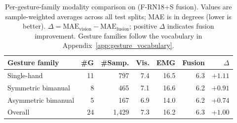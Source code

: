 \begin{table}[h]
\centering
\caption{Per-gesture-family modality comparison on \dataset{} (F-RN18+S fusion). Values are sample-weighted averages across all test splits; MAE is in degrees (lower is better). $\Delta = \text{MAE}_\text{vision} - \text{MAE}_\text{fusion}$; positive $\Delta$ indicates fusion improvement. Gesture families follow the vocabulary in Appendix~\ref{app:gesture_vocabulary}.}
\label{tab:per_gesture_family}
\footnotesize
\setlength{\tabcolsep}{3.8pt}
\renewcommand{\arraystretch}{1.08}
\begin{tabular}{lrrrrrr}
\toprule
Gesture family & \#G & \#Samp. & Vis. & EMG & Fusion & $\Delta$ \\
\midrule
Single-hand & 11 & 797 & 7.4 & 16.5 & 6.3 & $\mathbf{+1.11}$ \\
Symmetric bimanual & 8 & 465 & 7.1 & 16.6 & 6.2 & $+0.91$ \\
Asymmetric bimanual & 5 & 167 & 6.9 & 14.0 & 6.2 & $+0.74$ \\
\midrule
Overall & 24 & 1,429 & 7.3 & 16.2 & 6.3 & $+1.00$ \\
\bottomrule
\end{tabular}
\end{table}